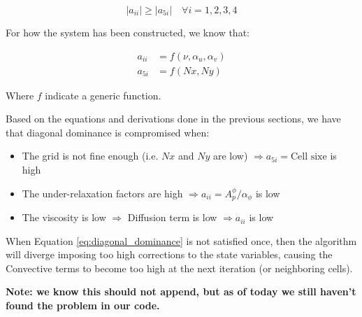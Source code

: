 \begin{equation}
    |a_{ii}| \geq |a_{5i}| \quad \forall i = 1, 2, 3, 4
\end{equation}

For how the system has been constructed, we know that:

\begin{align}
    a_{ii} & = f(\nu, \alpha_u, \alpha_v) \\
    a_{5i} & = f(Nx, Ny)
\end{align}

Where $f$ indicate a generic function.

Based on the equations and derivations done in the previous sections, we have that diagonal dominance is compromised when:

\begin{itemize}
    \item The grid is not fine enough (i.e. $Nx$ and $Ny$ are low) $\Rightarrow a_{5i} = \text{Cell sixe}$ is high
    \item The under-relaxation factors are high $\Rightarrow a_{ii} = A_p^\phi / \alpha_\phi$ is low
    \item The viscosity is low $\Rightarrow$ Diffusion term is low $\Rightarrow a_{ii}$ is low
\end{itemize}

When Equation \ref{eq:diagonal_dominance} is not satisfied once, then the algorithm will diverge imposing too high corrections to the state variables, causing the Convective terms to become too high at the next iteration (or neighboring cells).

\vspace{1em}

\textbf{Note: we know this should not append, but as of today we still haven't found the problem in our code.}

